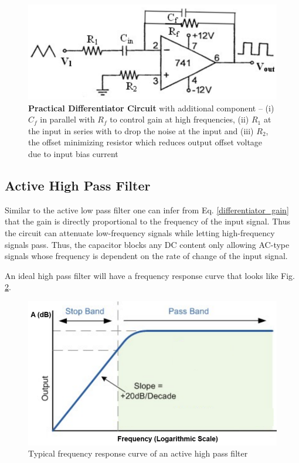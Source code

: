 \begin{figure}[H]
    \centering
    \includegraphics[width=0.90\columnwidth]{images/diffcircuit.png}
    \caption{\textbf{Practical Differentiator Circuit} with additional component -- (i) $C_f$ in parallel with $R_f$ to control gain at high frequencies, (ii) $R_1$ at the input in series with  to drop the noise at the input and (iii) $R_2$, the offset minimizing resistor which reduces output offset voltage due to input bias current}
    \label{diffexp}
\end{figure}



\subsection{Active High Pass Filter}

Similar to the active low pass filter one can infer from Eq. \ref{differentiator_gain} that the gain is directly proportional to the frequency of the input signal. Thus the circuit can attenuate low-frequency signals while letting high-frequency signals pass. Thus, the capacitor blocks any DC content only allowing AC-type signals whose frequency is dependent on the rate of change of the input signal.

An ideal high pass filter will have a frequency response curve that looks like Fig. \ref{highpassbode}.

\begin{figure}[H]
    \centering
    \includegraphics[width=0.8\columnwidth]{images/highpassbode.png}
    \caption{Typical frequency response curve of an active high pass filter}
    \label{highpassbode}
\end{figure}

